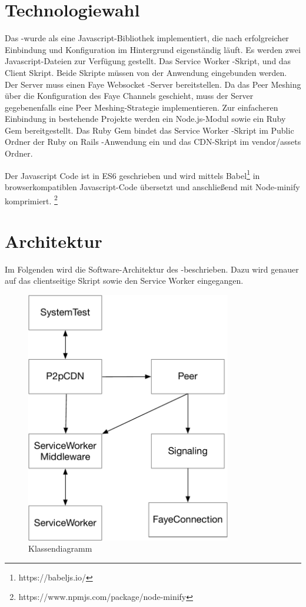 \section{Technologiewahl}\label{i:Technologiewahl}
Das \pTp-\cdn wurde als eine Javascript-Bibliothek implementiert, die nach erfolgreicher Einbindung und Konfiguration im Hintergrund eigenständig läuft. Es werden zwei Javascript-Dateien zur Verfügung gestellt. Das Service Worker -Skript, und das \pTp \cdn Client Skript. Beide Skripte müssen von der Anwendung eingebunden werden. Der Server muss einen Faye Websocket -Server bereitstellen. Da das Peer Meshing über die Konfiguration des Faye Channels geschieht, muss der Server gegebenenfalls eine Peer Meshing-Strategie implementieren. Zur einfacheren Einbindung in bestehende Projekte werden ein Node.js-Modul sowie ein Ruby Gem bereitgestellt. Das Ruby Gem bindet das Service Worker -Skript im Public Ordner der Ruby on Rails -Anwendung ein und das \pTp CDN-Skript im vendor/assets Ordner.

Der Javascript Code ist in ES6 geschrieben und wird mittels Babel\footnote{https://babeljs.io/} in browserkompatiblen Javascript-Code übersetzt und anschließend mit Node-minify komprimiert. \footnote{https://www.npmjs.com/package/node-minify}

\section{Architektur}\label{i:Architektur}
Im Folgenden wird die Software-Architektur des \pTp-\cdns beschrieben. Dazu wird genauer auf das clientseitige Skript sowie den Service Worker eingegangen. 

\begin{figure}[!h]
	\centering
	\includegraphics[width=0.8\textwidth]{figures/Klassendiagramm}
	\caption[Klassendiagramm]{Klassendiagramm}
	\label{fig:Klassendiagramm}
\end{figure}
